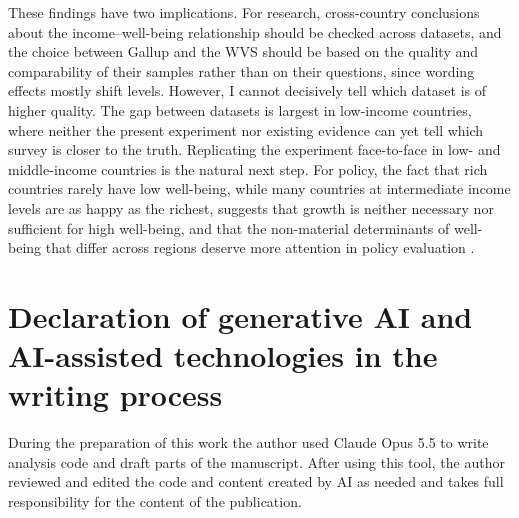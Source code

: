 \documentclass[12pt]{article}
\begin{document}
These findings have two implications. For research, cross-country conclusions about the income--well-being relationship should be checked across datasets, and the choice between Gallup and the WVS should be based on the quality and comparability of their samples rather than on their questions, since wording effects mostly shift levels. 
However, I cannot decisively tell which dataset is of higher quality. %
The gap between datasets is largest in low-income countries, 
where neither the present experiment nor existing evidence can yet tell which survey is closer to the truth. Replicating the experiment face-to-face in low- and middle-income countries is the natural next step. For policy, the fact that rich countries rarely have low well-being, while many countries at intermediate income levels are as happy as the richest, suggests that growth is neither necessary nor sufficient for high well-being, and that the non-material determinants of well-being that differ across regions deserve more attention in policy evaluation \citep{stiglitz_report_2009,frijters_happy_2020}.


\clearpage
\section*{Declaration of generative AI and AI-assisted technologies in the writing process}
During the preparation of this work the author used Claude Opus 5.5 to write analysis code and draft parts of the manuscript. After using this tool, the author reviewed and edited the code and content created by AI as needed and takes full responsibility for the content of the publication.


\end{document}
